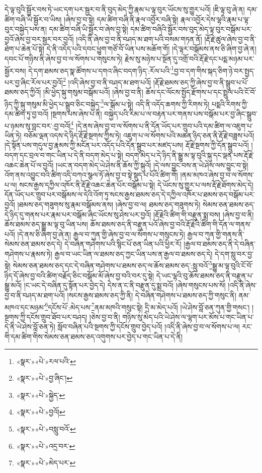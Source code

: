 དེ་ལྟ་བུའི་སྦྱོར་བས་ཏེ་ཡང་དག་པར་སྦྱར་བ་ནི་བུད་མེད་ཀྱི་རྣམ་པ་ལྟ་བུར་ཡོངས་སུ་གྱུར་པའོ། །ཇི་ལྟ་བུ་ཞེ་ན། དམ་ཚིག་བཞི་ཡི་སྦྱོར་བ་ཡིས། །ཞེས་བྱ་བ་སྟེ། དམ་ཚིག་བཞི་ནི་རྣལ་འབྱོར་བཞི་སྟེ། རྣལ་འབྱོར་དེས་ལྷའི་རྣམ་པ་ལྟ་བུར་བསྐྱེད་པས་ན། དམ་ཚིག་བཞི་ཡི་སྦྱོར་བ་ཞེས་བྱ་སྟེ། དམ་ཚིག་བཞིའི་སྦྱོར་བས་བུད་མེད་ལྟ་བུར་བསྒོམ་པར་བྱའོ་ཞེས་བྱ་བར་སྦྱར་བར་བྱའོ། །འདི་ནི་ཞེས་བྱ་བ་ནི་བཤད་མ་ཐག་པའི་བསམ་གཏན་ནོ། །རྡོ་རྗེ་ཚུལ་ཞེས་བྱ་བ་ནི་ཐེག་པ་ཆེན་པོ་སྟེ། དེ་ནི་འདོད་པའི་དབང་ཕྱུག་གཙོ་བོ་ཡིན་པས་མཆོག་གོ། །དེ་ལྟར་བསྒོམས་ནས་ཅི་ཞིག་བྱ་ཞེ་ན། དབང་པོ་གཉིས་ནི་ཞེས་བྱ་བ་ལ་སོགས་པ་གསུངས་ཏེ། རྗེས་སུ་མཉེས་པ་སྔོན་དུ་འགྲོ་བའི་རྡོ་རྗེ་དང་པདྨ་མཉམ་པར་སྦྱོར་བས། དེ་དག་ཐམས་ཅད་སྣ་ཚོགས་པ་དགའ་ཞིང་བདག་ཉིད་:རོལ་པའི་\footnote{«སྣར་»«པེ་»རལ་པའི་}བྱ་བ་དག་གིས་སྐད་ཅིག་ཉེ་བར་སྤྱད་པར་བྱ་ཞིང་རོལ་པར་བྱའོ།\footnote{«སྣར་»«པེ་»བྱ་ཞིང་།} །འདི་ཞེས་བྱ་བ་ནི་བཤད་མ་ཐག་པའོ། །རྡོ་རྗེ་ཐམས་ཅད་ཀྱི་ཞེས་བྱ་བ་ནི་སྒྲུབ་པ་པོ་ཐམས་ཅད་ཀྱིའོ། །མི་ཕྱེད་སྐུ་གསུམ་བསྒོམ་པའོ། །ཞེས་བྱ་བ་ནི། ཆོས་དང་ལོངས་སྤྱོད་རྫོགས་པ་དང་སྤྲུལ་པའི་ངོ་བོ་ཉིད་ཀྱི་སྐུ་གསུམ་མི་ཕྱེད་པ་སྒྲུབ་ཅིང་བསྐྱེད་\footnote{«སྣར་»«པེ་»སྐྱེད་}ལ་སྒོམ་པ་སྟེ། འདི་ནི་འདོད་ཆགས་ཀྱི་རིགས་ཏེ། པདྨའི་རིགས་ཀྱི་དམ་ཚིག་ཏུ་བྱ་བའོ། །སྔགས་པས་ཞེས་པ་ནི། བསྐྱེད་པའི་རིམ་པ་ལ་བརྟན་པར་གནས་པས་བསྒོམ་པར་བྱ་ཞིང་སྒྲུབ་པ་ཉམས་སུ་བླང་བར་:བྱ་བའོ།\footnote{«སྣར་»«པེ་»བྱའོ།} །དེ་ནས་ཞེས་བྱ་བ་ལ་སོགས་པ་ནི་དོན་ཡོད་པར་གྲུབ་པའི་དམ་ཚིག་ལ་འཇུག་པ་ཡིན་ཏེ། བཅོམ་ལྡན་འདས་དེ་ཉིད་རྡོ་རྗེ་སྔགས་ཀྱིས་ཏེ། འཇུག་པ་ལ་སོགས་པའི་མཚན་ཉིད་ཅན་ནི་རྡོ་རྗེ་བཟླས་པའོ། །དེ་སྟོན་པས་གདུལ་བྱ་རྣམས་ཀྱི་མངོན་པར་འདོད་པའི་དོན་སྒྲུབ་པར་མཛད་པས། རྡོ་རྗེ་སྔགས་ཀྱི་དོན་སྒྲུབ་པའོ། །བདག་དང་བྲལ་བ་གང་ཡིན་པ་དེ་ནི་བདག་མེད་པ་སྟེ། བདག་མེད་པ་དེ་ཉིད་ནི་སྒྱུ་མ་ལྟ་བུའི་སྐུ་དང་ལྡན་པས་རྡོ་རྗེ་འཆང་ཆེན་པོ་ལ་བྱའོ། །ཡང་ན་བདག་མེད་ཡེ་ཤེས་ནི་ཆོས་ཀྱི་སྐུའོ། །དེ་ལས་བྱུང་བས་ན་ཡེ་ཤེས་ལས་བྱུང་བ་སྟེ། འོག་ནས་འབྱུང་བའི་ཚིག་འདི་བཀའ་སྩལ་ཏོ་ཞེས་བྱ་བ་སྟེ་སྡུད་པ་པོའི་ཚིག་གོ། །ནམ་མཁའ་ཞེས་བྱ་བ་ལ་སོགས་པ་ལ། སངས་རྒྱས་དཀྱིལ་འཁོར་ནི་རྡོ་རྗེ་འཆང་ཆེན་པོར་བསྒོམ་པ་སྟེ། དེ་ཡོངས་སུ་གྱུར་པ་ལས་རྡོ་རྗེ་ཐོགས་མེད་དེ། དོན་ཡོད་པར་གྲུབ་པར་བསྒོམས་ལ་དེའི་འོག་ཏུ་སངས་རྒྱས་ཐམས་ཅད་དེ་དཀྱིལ་འཁོར་པ་ཐམས་ཅད་བསྒོམ་པར་བྱའོ། །ཐམས་ཅད་གཟུགས་སུ་རྣམ་བསྒོམས་ནས། །ཞེས་བྱ་བ་ལ། ཐམས་ཅད་གཟུགས་ཏེ། སེམས་ཅན་ཐམས་ཅད་དེ་ཉིད་དུ་གནས་པར་རྣམ་པར་བསྒོམ་ཞིང་ཡོངས་སུ་ཤེས་པར་བྱའོ། །རྡོ་རྗེའི་ཚིག་གི་བརྫུན་སྨྲ་བས། །ཞེས་བྱ་བ་ནི། ཆོས་ཐམས་ཅད་སྒྱུ་མ་ལྟ་བུ་ཡིན་པས། ཆོས་ཐམས་ཅད་ནི་བརྫུན་པའོ་ཞེས་བྱ་བའི་རྡོ་རྗེའི་ཚིག་གི་དོན་ལ་གནས་པའོ། །དེ་ནས་ཅི་ཞིག་བྱ་ཞེ་ན། རྒྱལ་བ་ཀུན་གྱི་ཞེས་བྱ་བ་ལ་སོགས་པ་གསུངས་ཏེ། རྒྱལ་བ་ཀུན་གྱི་གནས་ནི་སེམས་ཅན་ཐམས་ཅད་དེ། དེ་བཞིན་གཤེགས་པའི་སྙིང་པོ་ཅན་ཡིན་པའི་ཕྱིར་རོ། །རྒྱལ་བ་ཐམས་ཅད་ནི་དེ་བཞིན་གཤེགས་པ་རྣམས་ཏེ། རྒྱལ་བ་ཡང་ཡིན་ལ་ཐམས་ཅད་ཀྱང་ཡིན་པས་ན་རྒྱལ་བ་ཐམས་ཅད་དེ། དེ་དག་སླུ་བར་བྱ་སྟེ། སེམས་ཅན་ཐམས་ཅད་དང་དེ་བཞིན་གཤེགས་པ་ཐམས་ཅད་ལ་ཆོས་ཐམས་ཅད་:སླུ་བའོ་\footnote{«སྣར་»«པེ་»བསླུ་བའོ་}སྒྱུ་མ་ལྟ་བུའི་ངོ་བོ་ཉིད་དོ་ཞེས་བྱ་བའི་ཚིག་བརྗོད་ཅིང་བསྒོམ་མོ་ཞེས་བྱ་བའི་བར་དུ་སྟེ། དེ་ཡང་ལྷའི་བུ་ཆོས་ཐམས་ཅད་ནི་བརྫུན་པ་སྒྱུ་མའོ། །ང་ཡང་དེ་བཞིན་དུ་སྟོན་པར་བྱེད་དེ། དེས་ན་ང་ནི་བརྫུན་དུ་སྨྲ་བའོ། །ཞེས་གསུངས་པས་སོ། །འདི་ནི་ཞེས་བྱ་བ་ནི་བཤད་མ་ཐག་པའོ། །སངས་རྒྱས་ཐམས་ཅད་ཀྱི་ནི། དེ་བཞིན་གཤེགས་པ་ཐམས་ཅད་ཀྱི་གསུང་ནི། ནམ་མཁའ་དང་མཉམ་\footnote{«སྣར་»«པེ་»འདྲ་བར་}དངོས་པོ་:མེད་པས་\footnote{«སྣར་»«པེ་»མེད་པར་}ནམ་མཁའི་གསུང་སྟེ། དྲི་མ་མེད་པའོ། །ཡེ་ཤེས་བློ་ཅན་ཀུན་གྱི་གསང་། །སྔགས་ཀྱི་དངོས་གྲུབ་ཐོབ་པར་བཤད། །ཅེས་བྱ་བ་ནི། གཉིས་སུ་མེད་པའི་ཡེ་ཤེས་ལ་ལྷག་པར་མོས་པ་གང་ཡིན་པ་དེ་ནི་ཡེ་ཤེས་བློ་ཅན་ཏེ། སློབ་བཞིན་པའི་སྔགས་ཀྱི་དངོས་གྲུབ་བྱེད་པའོ། །འདི་ནི་ཞེས་བྱ་བ་ལ་སོགས་པ་ལ། རང་གི་དམ་ཚིག་གིས་སེམས་ཅན་ཐམས་ཅད་འགུགས་པར་བྱེད་པ་གང་ཡིན་པ་དེ་ནི། 